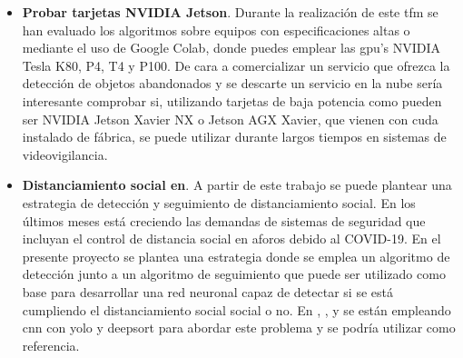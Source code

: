 \begin{itemize}
    \item \textbf{Probar tarjetas NVIDIA Jetson}. Durante la realización de este \gls{tfm} se han evaluado los algoritmos sobre equipos con especificaciones altas o mediante el uso de Google Colab, donde puedes emplear las \gls{gpu}'s NVIDIA Tesla K80, P4, T4 y P100. De cara a comercializar un servicio que ofrezca la detección de objetos abandonados y se descarte un servicio en la nube sería interesante comprobar si, utilizando tarjetas de baja potencia como pueden ser NVIDIA Jetson Xavier NX o Jetson AGX Xavier, que vienen con \gls{cuda} instalado de fábrica, se puede utilizar durante largos tiempos en sistemas de videovigilancia.
    \item \textbf{Distanciamiento social en}. A partir de este trabajo se puede plantear una estrategia de detección y seguimiento de distanciamiento social. En los últimos meses está creciendo las demandas de sistemas de seguridad que incluyan el control de distancia social en aforos debido al COVID-19. En el presente proyecto se plantea una estrategia donde se emplea un algoritmo de detección junto a un algoritmo de seguimiento que puede ser utilizado como base para desarrollar una red neuronal capaz de detectar si se está cumpliendo el distanciamiento social social o no. En \cite{punn2020monitoring}, \cite{Rezaei_2020}, \cite{Gupta_2020} y \cite{fan2020autonomous} se están empleando \gls{cnn} con \gls{yolo} y \gls{deepsort} para abordar este problema y se podría utilizar como referencia.
    
\end{itemize}